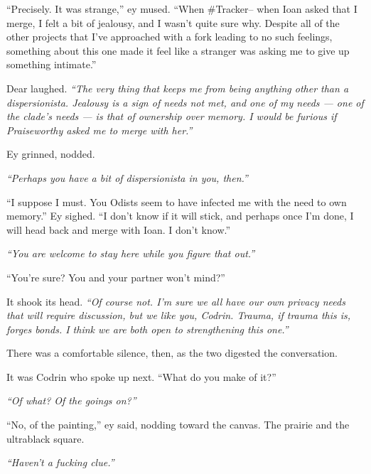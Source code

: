 ``Precisely. It was strange,'' ey mused. ``When \#Tracker-- when Ioan asked that I merge, I felt a bit of jealousy, and I wasn't quite sure why. Despite all of the other projects that I've approached with a fork leading to no such feelings, something about this one made it feel like a stranger was asking me to give up something intimate.''

Dear laughed. \emph{``The very thing that keeps me from being anything other than a dispersionista. Jealousy is a sign of needs not met, and one of my needs — one of the clade's needs — is that of ownership over memory. I would be furious if Praiseworthy asked me to merge with her.''}

Ey grinned, nodded.

\emph{``Perhaps you have a bit of dispersionista in you, then.''}

``I suppose I must. You Odists seem to have infected me with the need to own memory.'' Ey sighed. ``I don't know if it will stick, and perhaps once I'm done, I will head back and merge with Ioan. I don't know.''

\emph{``You are welcome to stay here while you figure that out.''}

``You're sure? You and your partner won't mind?''

It shook its head. \emph{``Of course not. I'm sure we all have our own privacy needs that will require discussion, but we like you, Codrin. Trauma, if trauma this is, forges bonds. I think we are both open to strengthening this one.''}

There was a comfortable silence, then, as the two digested the conversation.

It was Codrin who spoke up next. ``What do you make of it?''

\emph{``Of what? Of the goings on?''}

``No, of the painting,'' ey said, nodding toward the canvas. The prairie and the ultrablack square.

\emph{``Haven't a fucking clue.''}

